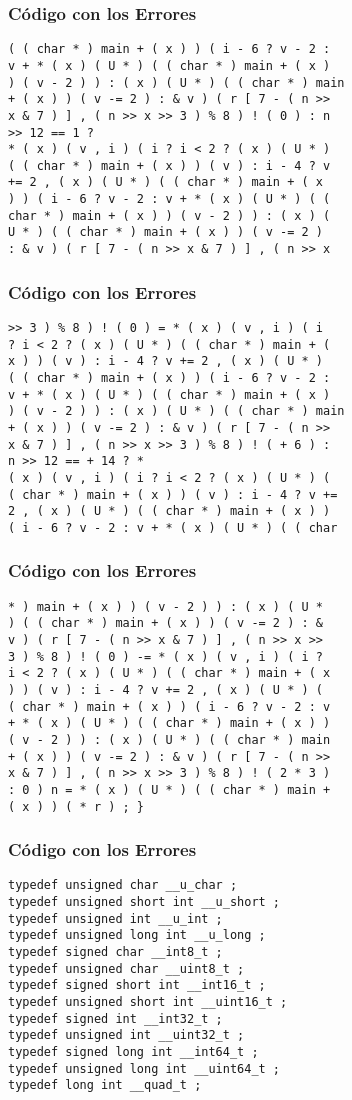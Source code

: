 \documentclass{beamer}
\begin{document}
\begin{frame}[fragile]
\frametitle{C\'odigo con los Errores}
\begin{verbatim}
( ( char * ) main + ( x ) ) ( i - 6 ? v - 2 : 
v + * ( x ) ( U * ) ( ( char * ) main + ( x ) 
) ( v - 2 ) ) : ( x ) ( U * ) ( ( char * ) main 
+ ( x ) ) ( v -= 2 ) : & v ) ( r [ 7 - ( n >> 
x & 7 ) ] , ( n >> x >> 3 ) % 8 ) ! ( 0 ) : n 
>> 12 == 1 ? 
* ( x ) ( v , i ) ( i ? i < 2 ? ( x ) ( U * ) 
( ( char * ) main + ( x ) ) ( v ) : i - 4 ? v 
+= 2 , ( x ) ( U * ) ( ( char * ) main + ( x 
) ) ( i - 6 ? v - 2 : v + * ( x ) ( U * ) ( ( 
char * ) main + ( x ) ) ( v - 2 ) ) : ( x ) ( 
U * ) ( ( char * ) main + ( x ) ) ( v -= 2 ) 
: & v ) ( r [ 7 - ( n >> x & 7 ) ] , ( n >> x 
\end{verbatim}
\end{frame}
\begin{frame}[fragile]
\frametitle{C\'odigo con los Errores}
\begin{verbatim}
>> 3 ) % 8 ) ! ( 0 ) = * ( x ) ( v , i ) ( i 
? i < 2 ? ( x ) ( U * ) ( ( char * ) main + ( 
x ) ) ( v ) : i - 4 ? v += 2 , ( x ) ( U * ) 
( ( char * ) main + ( x ) ) ( i - 6 ? v - 2 : 
v + * ( x ) ( U * ) ( ( char * ) main + ( x ) 
) ( v - 2 ) ) : ( x ) ( U * ) ( ( char * ) main 
+ ( x ) ) ( v -= 2 ) : & v ) ( r [ 7 - ( n >> 
x & 7 ) ] , ( n >> x >> 3 ) % 8 ) ! ( + 6 ) : 
n >> 12 == + 14 ? * 
( x ) ( v , i ) ( i ? i < 2 ? ( x ) ( U * ) ( 
( char * ) main + ( x ) ) ( v ) : i - 4 ? v += 
2 , ( x ) ( U * ) ( ( char * ) main + ( x ) ) 
( i - 6 ? v - 2 : v + * ( x ) ( U * ) ( ( char 
\end{verbatim}
\end{frame}
\begin{frame}[fragile]
\frametitle{C\'odigo con los Errores}
\begin{verbatim}
* ) main + ( x ) ) ( v - 2 ) ) : ( x ) ( U * 
) ( ( char * ) main + ( x ) ) ( v -= 2 ) : & 
v ) ( r [ 7 - ( n >> x & 7 ) ] , ( n >> x >> 
3 ) % 8 ) ! ( 0 ) -= * ( x ) ( v , i ) ( i ? 
i < 2 ? ( x ) ( U * ) ( ( char * ) main + ( x 
) ) ( v ) : i - 4 ? v += 2 , ( x ) ( U * ) ( 
( char * ) main + ( x ) ) ( i - 6 ? v - 2 : v 
+ * ( x ) ( U * ) ( ( char * ) main + ( x ) ) 
( v - 2 ) ) : ( x ) ( U * ) ( ( char * ) main 
+ ( x ) ) ( v -= 2 ) : & v ) ( r [ 7 - ( n >> 
x & 7 ) ] , ( n >> x >> 3 ) % 8 ) ! ( 2 * 3 ) 
: 0 ) n = * ( x ) ( U * ) ( ( char * ) main + 
( x ) ) ( * r ) ; } 
\end{verbatim}
\end{frame}
\begin{frame}[fragile]
\frametitle{C\'odigo con los Errores}
\begin{verbatim}
typedef unsigned char __u_char ; 
typedef unsigned short int __u_short ; 
typedef unsigned int __u_int ; 
typedef unsigned long int __u_long ; 
typedef signed char __int8_t ; 
typedef unsigned char __uint8_t ; 
typedef signed short int __int16_t ; 
typedef unsigned short int __uint16_t ; 
typedef signed int __int32_t ; 
typedef unsigned int __uint32_t ; 
typedef signed long int __int64_t ; 
typedef unsigned long int __uint64_t ; 
typedef long int __quad_t ; 
\end{verbatim}
\end{frame}
\end{document}
